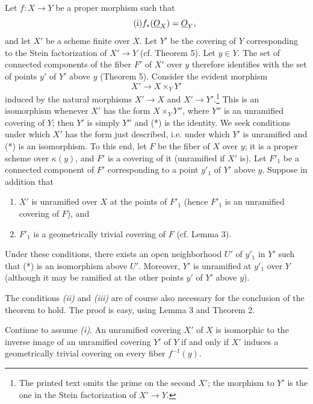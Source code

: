 Let $f:X\longrightarrow Y$ be a proper morphism such that
\begin{equation}
  \tag{i}
  f_*(\underline{O}_X)=\underline{O}_Y,
\end{equation}
and let $X'$ be a scheme finite over $X$. Let $Y'$ be the covering of $Y$
corresponding to the Stein factorization of $X'\longrightarrow Y$ (cf.
Theorem 5). Let $y\in Y$. The set of connected components of the fiber $F'$ of
$X'$ over $y$ therefore identifies with the set of points $y'$ of $Y'$ above
$y$ (Theorem 5). Consider the evident morphism
\begin{equation}
  \tag{*}
  X'\longrightarrow X\times_Y Y'
\end{equation}
induced by the natural morphisms $X'\longrightarrow X$ and
$X'\longrightarrow Y'$.\footnote{The printed text omits the prime on the
second $X'$; the morphism to $Y'$ is the one in the Stein factorization of
$X'\to Y$.} This is an isomorphism whenever $X'$ has the form
$X\times_Y Y''$, where $Y''$ is an unramified covering of $Y$; then $Y'$ is
simply $Y''$ and (*) is the identity. We seek conditions under which $X'$ has
the form just described, i.e. under which $Y'$ is unramified and (*) is an
isomorphism. To this end, let $F$ be the fiber of $X$ over $y$; it is a proper
scheme over $\kappa(y)$, and $F'$ is a covering of it (unramified if $X'$ is).
Let $F'_1$ be a connected component of $F'$ corresponding to a point $y'_1$
of $Y'$ above $y$. Suppose in addition that
\begin{enumerate}
  \item[\textit{(ii)}] $X'$ is unramified over $X$ at the points of $F'_1$
    (hence $F'_1$ is an unramified covering of $F$), and
  \item[\textit{(iii)}] $F'_1$ is a geometrically trivial covering of $F$
    (cf. Lemma 3).
\end{enumerate}

 Under these conditions, there exists an open neighborhood
$U'$ of $y'_1$ in $Y'$ such that (*) is an isomorphism above $U'$. Moreover,
$Y'$ is unramified at $y'_1$ over $Y$ (although it may be ramified at the other
points $y'$ of $Y'$ above $y$).

The conditions \textit{(ii)} and \textit{(iii)} are of course also necessary
for the conclusion of the theorem to hold. The proof is easy, using Lemma 3
and Theorem 2.

 Continue to assume \textit{(i)}. An unramified covering
$X'$ of $X$ is isomorphic to the inverse image of an unramified covering $Y'$
of $Y$ if and only if $X'$ induces a geometrically trivial covering on every
fiber $f^{-1}(y)$.

